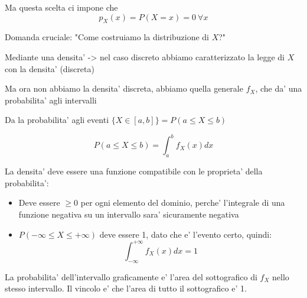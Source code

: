 Ma questa scelta ci impone che
\[
  p_X(x) = P(X = x) = 0 \ \forall x
\]

Domanda cruciale: "Come costruiamo la distribuzione di $ X $?"

Mediante una densita' -> nel caso discreto abbiamo caratterizzato la legge di $ X $ con la densita' (discreta)

Ma ora non abbiamo la densita' discreta, abbiamo quella generale $ f_X $, che da' una probabilita' agli intervalli

Da la probabilita' agli eventi $ \{X \in [a,b]\}  = P(a\leq X \leq b) $

\[
  P(a \leq X \leq b) = \int_{a}^{b} f_X(x)dx
\]

La densita' deve essere una funzione compatibile con le proprieta' della probabilita':
\begin{itemize}
\item Deve essere $ \geq 0 $ per ogni elemento del dominio, perche' l'integrale di una funzione negativa su un intervallo sara' sicuramente negativa
\item $ P(-\infty \leq X \leq +\infty) $ deve essere 1, dato che e' l'evento certo, quindi:
  \[
    \int_{-\infty}^{+\infty}f_X(x)dx = 1
  \]
\end{itemize}


La probabilita' dell'intervallo graficamente e' l'area del sottografico di $ f_X $ nello stesso intervallo. Il vincolo e' che l'area di tutto il sottografico e' 1.



